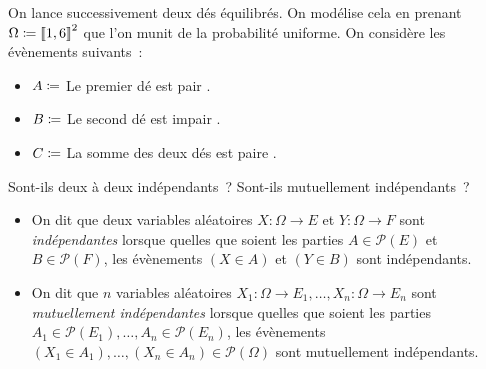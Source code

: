 \documentclass{magnolia}
\begin{document}
\begin{exoUnique}
\exo On lance successivement deux dés équilibrés. On modélise cela en prenant
  $\Omega\coloneqq\left\llbracket 1,6\right\rrbracket^2$ que l'on munit de la probabilité uniforme.
  On considère les évènements suivants~:
  \begin{itemize}
  \item $A\coloneqq$ \og Le premier dé est pair \fg.
  \item $B\coloneqq$ \og Le second dé est impair \fg.
  \item $C\coloneqq$ \og La somme des deux dés est paire \fg.
  \end{itemize}
  Sont-ils deux à deux indépendants~? Sont-ils mutuellement indépendants~?
\end{exoUnique}

\begin{definition}
\begin{itemize}
\item On dit que deux variables aléatoires $X:\Omega\to E$ et $Y:\Omega\to F$ sont
  \emph{indépendantes} lorsque quelles que soient les parties $A\in\mathcal{P}(E)$ et
  $B\in\mathcal{P}(F)$, les évènements $(X\in A)$ et $(Y\in B)$ sont
  indépendants.
\item On dit que $n$ variables aléatoires $X_1:\Omega\to E_1,\ldots,X_n:\Omega\to E_n$ sont
\emph{mutuellement indépendantes} lorsque quelles que soient les parties
$A_1\in\mathcal{P}(E_1),\ldots,A_n\in\mathcal{P}(E_n)$, les évènements
$(X_1\in A_1),\ldots,(X_n\in A_n)\in\mathcal{P}(\Omega)$ sont mutuellement indépendants.
\end{itemize}
\end{definition}
\end{document}

